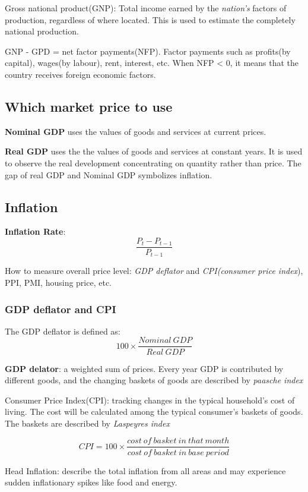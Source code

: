 \documentclass[10pt, a4paper]{article}
\begin{document}
            Gross national product(GNP): Total income earned by the \emph{nation's} factors of production, regardless of where located. This is used to estimate the completely national production.

            GNP - GPD = net factor payments(NFP). Factor payments such as profits(by capital), wages(by labour), rent, interest, etc. When NFP < 0, it means that the country receives foreign economic factors. 

        \subsection{Which market price to use}
            \textbf{Nominal GDP} uses the values of goods and services at current prices. 

            \textbf{Real GDP} uses the the values of goods and services at constant years. It is used to observe the real development concentrating on quantity rather than price. The gap of real GDP and Nominal GDP symbolizes inflation. 
        \subsection{Inflation} 
            \textbf{Inflation Rate}: $$\frac{P_t - P_{t - 1}}{P_{t - 1}}$$
            
            How to measure overall price level: \emph{GDP deflator} and \emph{CPI(consumer price index}), PPI, PMI, housing price, etc. 

            \subsubsection{GDP deflator and CPI}
            The GDP deflator is defined as:
             $$100 \times \frac{Nominal\ GDP}{Real\ GDP}$$
            
             \textbf{GDP delator}: a weighted sum of prices. Every year GDP is contributed by different goods, and the changing baskets of goods are described by \emph{paasche index}

             Consumer Price Index(CPI): tracking changes in the typical household's cost of living. The cost will be calculated among the typical consumer's baskets of goods. The baskets are described by \emph{Laspeyres index}

             $$CPI = 100 \times \frac{cost\ of\ basket\ in\ that\ month}{cost\ of\  basket\ in\ base\ period}$$

            Head Inflation: describe the total inflation from all areas and may experience sudden inflationary spikes like food and energy. 
\end{document}
